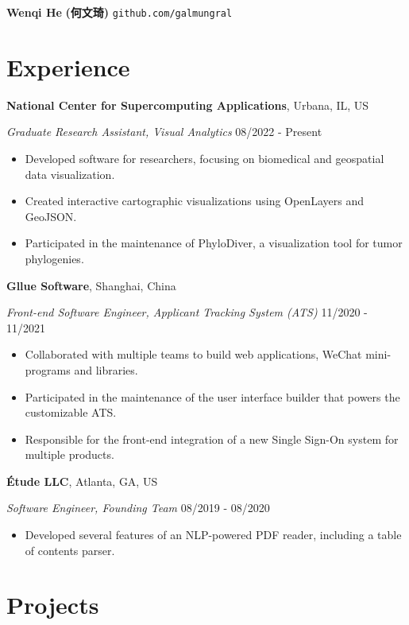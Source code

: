 \documentclass[12pt]{article}
\begin{document}
{\Huge\bf Wenqi He} {\Large\bf\cjkfont (何文琦)} \quad \texttt{github.com/galmungral}

\section*{Experience}

\textbf{National Center for Supercomputing Applications}, Urbana, IL, US

\textit{Graduate Research Assistant, Visual Analytics} \hfill 08/2022 - Present

\begin{itemize}
\item Developed software for researchers, focusing on biomedical and geospatial data visualization.
\item Created interactive cartographic visualizations using OpenLayers and GeoJSON.
\item Participated in the maintenance of PhyloDiver, a visualization tool for tumor phylogenies.
\end{itemize}

\textbf{Gllue Software}, Shanghai, China

\textit{Front-end Software Engineer, Applicant Tracking System (ATS)} \hfill 11/2020 - 11/2021

\begin{itemize}
\item Collaborated with multiple teams to build web applications, WeChat mini-programs and libraries.
\item Participated in the maintenance of the user interface builder that powers the customizable ATS.
\item Responsible for the front-end integration of a new Single Sign-On system for multiple products.
\end{itemize}

\textbf{Étude LLC}, Atlanta, GA, US

\textit{Software Engineer, Founding Team} \hfill 08/2019 - 08/2020

\begin{itemize}
\item Developed several features of an NLP-powered PDF reader, including a table of contents parser.
\end{itemize}

\section*{Projects}
\end{document}
